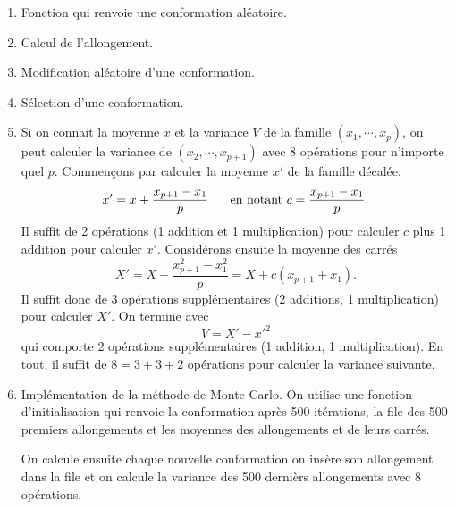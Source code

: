\begin{enumerate}
  \item Fonction qui renvoie une conformation aléatoire.

  
  \item Calcul de l'allongement.
  
  
  \item Modification aléatoire d'une conformation.


  \item Sélection d'une conformation.


  \item Si on connait la moyenne $x$ et la variance $V$ de la famille  $(x_1, \cdots, x_p)$, on peut calculer la variance de $(x_2,\cdots, x_{p+1})$ avec 8 opérations pour n'importe quel $p$.\newline
  Commençons par calculer la moyenne $x'$ de la famille décalée:
\[
 x' = x + \frac{x_{p+1} -x_{1}}{p} \hspace{0.5cm} \text{ en notant } c = \frac{x_{p+1} -x_{1}}{p}.
\]
Il suffit de 2 opérations (1 addition et 1 multiplication) pour calculer $c$ plus 1 addition pour calculer $x'$.\newline
Considérons ensuite la moyenne des carrés
\[
 X' = X + \frac{x_{p+1}^2 -x_{1}^2}{p} = X + c(x_{p+1} + x_{1}).
\]
Il suffit donc de 3 opérations supplémentaires (2 additions, 1 multiplication) pour calculer $X'$. On termine avec
\[
 V = X' - x'^2
\]
qui comporte 2 opérations supplémentaires (1 addition, 1 multiplication).\newline
En tout, il suffit de $8 = 3 + 3 + 2$ opérations pour calculer la variance suivante.

  \item Implémentation de la méthode de Monte-Carlo. On utilise une fonction d'initialisation qui renvoie la conformation après 500 itérations, la file des 500 premiers allongements et les moyennes des allongements et de leurs carrés.

On calcule ensuite chaque nouvelle conformation on insère son allongement dans la file et on calcule la variance des 500 dernièrs allongements avec 8 opérations.

\end{enumerate}
